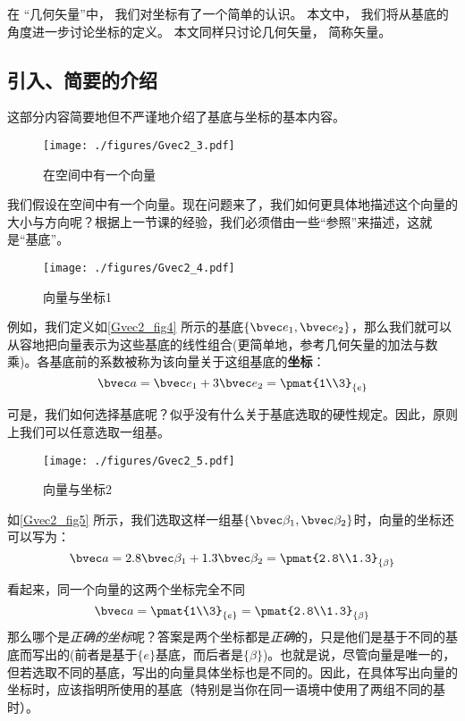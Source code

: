 

在 “几何矢量”中， 我们对坐标有了一个简单的认识。 本文中， 我们将从基底的角度进一步讨论坐标的定义。 本文同样只讨论几何矢量， 简称矢量。

\subsection{引入、简要的介绍}
这部分内容简要地但不严谨地介绍了基底与坐标的基本内容。
\begin{figure}[ht]
\centering
\texttt{[image: ./figures/Gvec2\_3.pdf]}
\caption{在空间中有一个向量} \label{Gvec2_fig3}
\end{figure}

我们假设在空间中有一个向量。现在问题来了，我们如何更具体地描述这个向量的大小与方向呢？根据上一节课的经验，我们必须借由一些“参照”来描述，这就是“基底”。

\begin{figure}[ht]
\centering
\texttt{[image: ./figures/Gvec2\_4.pdf]}
\caption{向量与坐标1} \label{Gvec2_fig4}
\end{figure}
例如，我们定义如\autoref{Gvec2_fig4} 所示的基底$\{\bvec e_1,\bvec e_2\}$，那么我们就可以从容地把向量表示为这些基底的线性组合(更简单地，参考几何矢量的加法与数乘)。各基底前的系数被称为该向量关于这组基底的\textbf{坐标}：
$$\bvec a = \bvec e_1 + 3\bvec e_2=
\pmat{1\\3}_{\{e\}}$$

可是，我们如何选择基底呢？似乎没有什么关于基底选取的硬性规定。因此，原则上我们可以任意选取一组基。
\begin{figure}[ht]
\centering
\texttt{[image: ./figures/Gvec2\_5.pdf]}
\caption{向量与坐标2} \label{Gvec2_fig5}
\end{figure}
如\autoref{Gvec2_fig5} 所示，我们选取这样一组基$\{\bvec \beta_1,\bvec \beta_2\}$时，向量的坐标还可以写为：
$$\bvec a = 2.8 \bvec \beta_1 + 1.3 \bvec \beta_2=
\pmat{2.8\\1.3}_{\{\beta\}}$$

看起来，同一个向量的这两个坐标完全不同
$$\bvec a = \pmat{1\\3}_{\{e\}} =
\pmat{2.8\\1.3}_{\{\beta\}}$$
那么哪个是\textsl{正确的坐标}呢？答案是两个坐标都是\textsl{正确}的，只是他们是基于不同的基底而写出的(前者是基于$\{e\}$基底，而后者是$\{\beta\}$)。也就是说，尽管向量是唯一的，但若选取不同的基底，写出的向量具体坐标也是不同的。因此，在具体写出向量的坐标时，应该指明所使用的基底（特别是当你在同一语境中使用了两组不同的基时）。

